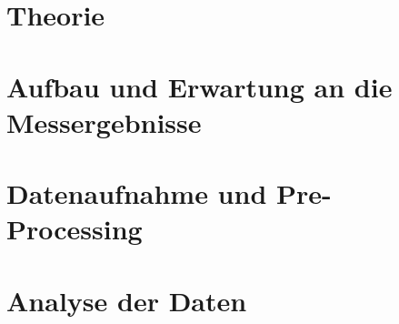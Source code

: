 \documentclass[11pt,a4paper,twoside,headsepline,numbers=noenddot,toc=bibliography,cleardoublepage=empty,parskip=half,DIV=calc,BCOR=6mm,pagesize=pdftex]{article}
\begin{document}
	
\pagestyle{empty}





\clearpage
\mbox{}
\clearpage
\pagestyle{plain}


% 


\tableofcontents
\clearpage
{}
\setcounter{page}{1}
 


\section{Theorie}
\label{sec:Theorie}

\clearpage

\section{Aufbau und Erwartung an die Messergebnisse}
\label{sec:Aufbau}

\clearpage

\section{Datenaufnahme und Pre-Processing}
\label{sec:Datenaufnahme und Pre-Processing}

\clearpage

\section{Analyse der Daten}
\label{sec:Analyse}

\clearpage
\end{document}
